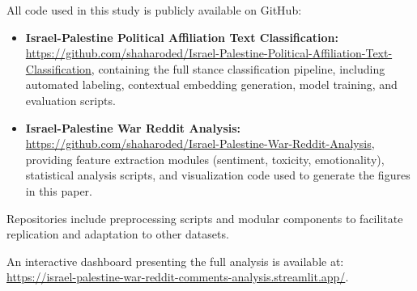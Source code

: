 \documentclass[letterpaper]{article} %
\begin{document}
All code used in this study is publicly available on GitHub:

\begin{itemize} 
    \item \textbf{Israel-Palestine Political Affiliation Text Classification:} \url{https://github.com/shaharoded/Israel-Palestine-Political-Affiliation-Text-Classification}, containing the full stance classification pipeline, including automated labeling, contextual embedding generation, model training, and evaluation scripts. 
    
    \item \textbf{Israel-Palestine War Reddit Analysis:} \url{https://github.com/shaharoded/Israel-Palestine-War-Reddit-Analysis}, providing feature extraction modules (sentiment, toxicity, emotionality), statistical analysis scripts, and visualization code used to generate the figures in this paper.
\end{itemize}

Repositories include preprocessing scripts and modular components to facilitate replication and adaptation to other datasets.

An interactive dashboard presenting the full analysis is available at:
\url{https://israel-palestine-war-reddit-comments-analysis.streamlit.app/}.



\end{document}
